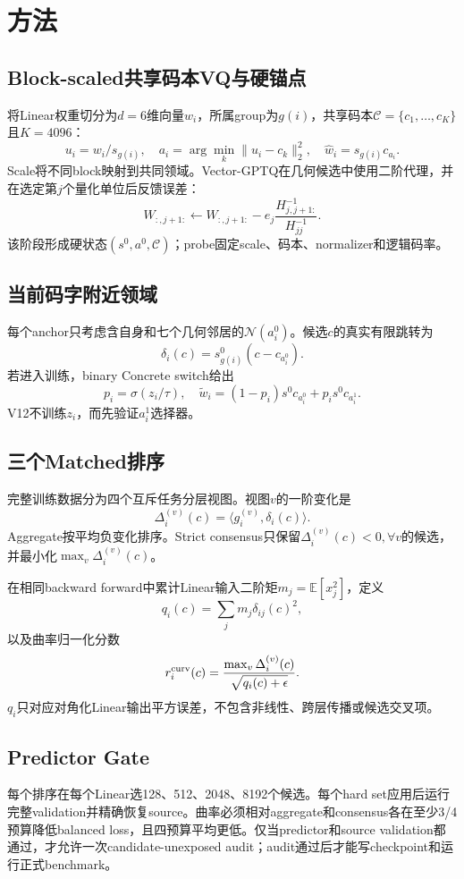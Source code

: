 \section{方法}

\subsection{Block-scaled共享码本VQ与硬锚点}

将Linear权重切分为$d=6$维向量$w_i$，所属group为$g(i)$，共享码本$\mathcal C=\{c_1,\ldots,c_K\}$且$K=4096$：
\begin{equation}
u_i=w_i/s_{g(i)},\quad a_i=\arg\min_k\|u_i-c_k\|_2^2,\quad \hat w_i=s_{g(i)}c_{a_i}.
\end{equation}
Scale将不同block映射到共同领域。Vector-GPTQ在几何候选中使用二阶代理，并在选定第$j$个量化单位后反馈误差：
\begin{equation}
W_{:,j+1:}\leftarrow W_{:,j+1:}-e_j\frac{H^{-1}_{j,j+1:}}{H^{-1}_{jj}}.
\end{equation}
该阶段形成硬状态$(s^0,a^0,\mathcal C)$；probe固定scale、码本、normalizer和逻辑码率。

\subsection{当前码字附近领域}

每个anchor只考虑含自身和七个几何邻居的$\mathcal N(a_i^0)$。候选$c$的真实有限跳转为
\begin{equation}
\delta_i(c)=s_{g(i)}^0(c-c_{a_i^0}).
\end{equation}
若进入训练，binary Concrete switch给出
\begin{equation}
p_i=\sigma(z_i/\tau),\quad \tilde w_i=(1-p_i)s^0c_{a_i^0}+p_i s^0c_{a_i^1}.
\end{equation}
V12不训练$z_i$，而先验证$a_i^1$选择器。

\subsection{三个Matched排序}

完整训练数据分为四个互斥任务分层视图。视图$v$的一阶变化是
\begin{equation}
\Delta_i^{(v)}(c)=\langle g_i^{(v)},\delta_i(c)\rangle.
\end{equation}
Aggregate按平均负变化排序。Strict consensus只保留$\Delta_i^{(v)}(c)<0,\forall v$的候选，并最小化$\max_v\Delta_i^{(v)}(c)$。

在相同backward forward中累计Linear输入二阶矩$m_j=\mathbb E[x_j^2]$，定义
\begin{equation}
q_i(c)=\sum_jm_j\delta_{ij}(c)^2,
\end{equation}
以及曲率归一化分数
\begin{equation}
r_i^{\rm curv}(c)=\frac{\max_v\Delta_i^{(v)}(c)}{\sqrt{q_i(c)+\epsilon}}.
\end{equation}
$q_i$只对应对角化Linear输出平方误差，不包含非线性、跨层传播或候选交叉项。

\subsection{Predictor Gate}

每个排序在每个Linear选128、512、2048、8192个候选。每个hard set应用后运行完整validation并精确恢复source。曲率必须相对aggregate和consensus各在至少3/4预算降低balanced loss，且四预算平均更低。仅当predictor和source validation都通过，才允许一次candidate-unexposed audit；audit通过后才能写checkpoint和运行正式benchmark。
